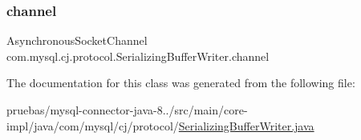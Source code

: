 \subsubsection{\texorpdfstring{channel}{channel}}
{\footnotesize\ttfamily Asynchronous\+Socket\+Channel com.\+mysql.\+cj.\+protocol.\+Serializing\+Buffer\+Writer.\+channel\hspace{0.3cm}{\ttfamily [protected]}}



The documentation for this class was generated from the following file\+:\begin{DoxyCompactItemize}
\item 
pruebas/mysql-\/connector-\/java-\/8../src/main/core-\/impl/java/com/mysql/cj/protocol/\mbox{\hyperlink{_serializing_buffer_writer_8java}{Serializing\+Buffer\+Writer.\+java}}\end{DoxyCompactItemize}
